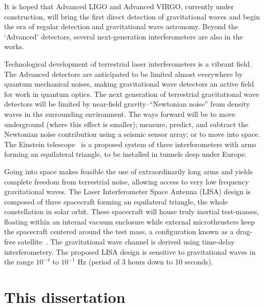 It is hoped that Advanced LIGO and Advanced VIRGO, currently under
construction, will bring the first direct detection of gravitational
waves and begin the era of regular detection and gravitational wave
astronomy.
%
Beyond the `Advanced' detectors, several next-generation
interferometers are also in the works.

Technological development of terrestrial laser
interferometers is a vibrant field.  The Advanced detectors are
anticipated to be limited almost everywhere by quantum mechanical
noises, making gravitational wave detectors an active field for work
in quantum optics.  The next generation of terrestrial gravitational
wave detectors will be limited by near-field gravity--``Newtonian
noise'' from density waves in the surrounding environment.  The ways
forward will be to move underground (where this effect is smaller);
measure, predict, and subtract the Newtonian noise contribution using
a seismic sensor array; or to move into space.
%
The Einstein telescope~\cite{EinsteinTelescopeDesignStudy2011} is a
proposed system of three interferometers with arms forming an
equilateral triangle, to be installed in tunnels deep under Europe.

Going into space makes feasible the use of extraordinarily long arms
and yields complete freedom from terrestrial noise, allowing access to
very low frequency gravitational waves.  The Laser Interferometer
Space Antenna (LISA) design is composed of three spacecraft forming an
equilateral triangle, the whole constellation in solar orbit\cite{Danzmann2003LISA}.  These
spacecraft will house truly inertial test-masses, floating within an
internal vacuum enclosure while external microthrusters keep the
spacecraft centered around the test mass, a configuration known as a drag-free satellite~\cite{Lange1964DragFree}.  The gravitational wave
channel is derived using time-delay interferometery.  The proposed
LISA design is sensitive to gravitational waves in the range $10^{-4}$
to $10^{-1}$ Hz (period of 3 hours down to 10 seconds).

\section{This dissertation}

